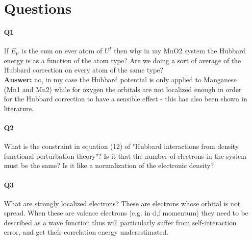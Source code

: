 \section{Questions}

\paragraph{Q1} If $E_U$ is the sum on ever atom of $U^I$ then why in my MnO2 system the Hubbard energy is as a function of the atom type? Are we doing a sort of average of the Hubbard correction on every atom of the same type? \\
\textbf{Answer:} no, in my case the Hubbard potential is only applied to Manganese (Mn1 and Mn2) while for oxygen the orbitals are not localized enough in order for the Hubbard correction to have a sensible effect - this has also been shown in literature.

\paragraph{Q2} What is the constraint in equation (12) of "Hubbard interactions from density functional perturbation theory"? Is it that the number of electrons in the system must be the same? Is it like a normalization of the electronic density?

\paragraph{Q3} What are strongly localized electrons? These are electrons whose orbital is not spread. When these are valence electrons (e.g. in d,f momentum) they need to be described as a wave function thus will particularly suffer from self-interaction error, and get their correlation energy underestimated.
